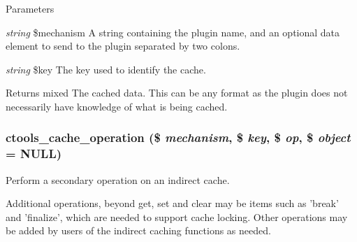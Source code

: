 \begin{DoxyParams}{Parameters}
\item[{\em string}]\$mechanism A string containing the plugin name, and an optional data element to send to the plugin separated by two colons.\item[{\em string}]\$key The key used to identify the cache.\end{DoxyParams}
\begin{DoxyReturn}{Returns}
mixed The cached data. This can be any format as the plugin does not necessarily have knowledge of what is being cached. 
\end{DoxyReturn}
\hypertarget{profiles_2dosomething_2modules_2contrib_2ctools_2includes_2cache_8inc_aaa68caf3223df01f8a019a10a7f5cbd9}{
\subsubsection[{ctools\_\-cache\_\-operation}]{\setlength{\rightskip}{0pt plus 5cm}ctools\_\-cache\_\-operation (\$ {\em mechanism}, \/  \$ {\em key}, \/  \$ {\em op}, \/  \$ {\em object} = {\ttfamily NULL})}}
\label{profiles_2dosomething_2modules_2contrib_2ctools_2includes_2cache_8inc_aaa68caf3223df01f8a019a10a7f5cbd9}
Perform a secondary operation on an indirect cache.

Additional operations, beyond get, set and clear may be items such as 'break' and 'finalize', which are needed to support cache locking. Other operations may be added by users of the indirect caching functions as needed.


